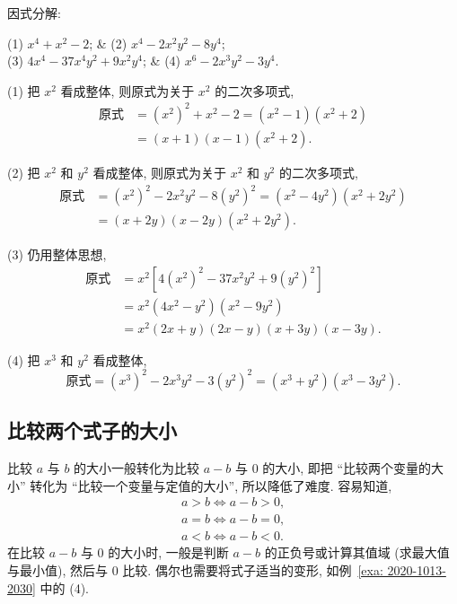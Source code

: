 \begin{example}
  因式分解:
  \begin{twocolpro}
  (1) $x^4+x^2-2$; & (2) $x^4-2x^2 y^2-8y^4$;\\
  (3) $4x^4-37x^4y^2+9x^2y^4$; & (4) $x^6-2x^3 y^2- 3y^4$.
  \end{twocolpro}
\end{example}
\begin{solution}
  (1) 把 $x^2$ 看成整体, 则原式为关于 $x^2$ 的二次多项式, 
  \begin{align*}
    \text{原式}
    &= (x^2)^2+x^2-2= (x^2-1)(x^2+2)\\
    &= (x+1)(x-1)(x^2+2).
  \end{align*}
  
  (2) 把 $x^2$ 和 $y^2$ 看成整体, 则原式为关于 $x^2$ 和 $y^2$ 的二次多项式, 
    \begin{align*}
      \text{原式}
      &= (x^2)^2- 2x^2 y^2-8(y^2)^2= (x^2-4y^2)(x^2+2y^2)\\
      &= (x+2y)(x-2y)(x^2+2y^2).
  \end{align*}
  
  (3) 仍用整体思想, 
    \begin{align*}
      \text{原式}
      &= x^2[4(x^2)^2- 37x^2 y^2+9(y^2)^2]\\
      &= x^2(4x^2-y^2)(x^2-9y^2)\\
      &= x^2(2x+y)(2x-y)(x+3y)(x-3y).
  \end{align*}
  
  (4) 把 $x^3$ 和 $y^2$ 看成整体, 
  \[\text{原式}= (x^3)^2- 2x^3 y^2- 3(y^2)^2
      = (x^3+y^2)(x^3-3y^2).\]
\end{solution}

\subsection{比较两个式子的大小}

比较 $a$ 与 $b$ 的大小一般转化为比较 $a-b$ 与 $0$ 的大小, 即把 ``比较两个变量的大小'' 转化为 ``比较一个变量与定值的大小'', 所以降低了难度. 容易知道,
\begin{align*}
  a>b \Leftrightarrow a-b>0,\\
  a=b \Leftrightarrow a-b=0,\\
  a<b \Leftrightarrow a-b<0.
\end{align*}
在比较 $a-b$ 与 $0$ 的大小时, 一般是判断 $a-b$ 的正负号或计算其值域 (求最大值与最小值), 然后与 $0$ 比较. 偶尔也需要将式子适当的变形, 如例~\ref{exa: 2020-1013-2030} 中的 (4).

